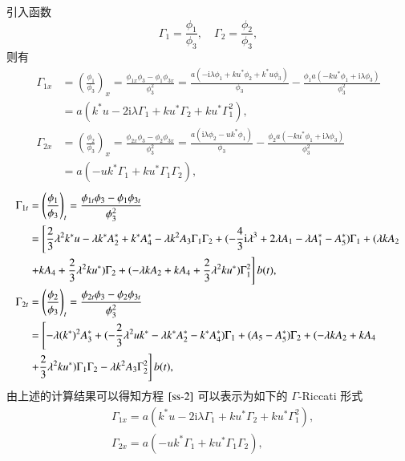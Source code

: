 引入函数
\begin{equation}
  \Gamma_{1} = \frac{\phi_{1}}{\phi_{3}}, \quad \Gamma_{2} = \frac{\phi_{2}}{\phi_{3}},
\end{equation}
则有
\begin{align}
  \Gamma_{1x} &= \left(\frac{\phi_1}{\phi_3}\right)_x=\frac{\phi_{1x}\phi_3-\phi_1\phi_{3x}}{\phi_3^2}=\frac{a(-\mathrm{i}\lambda\phi_1+ku^*\phi_2+k^*u\phi_3)}{\phi_3}-\frac{\phi_1a(-ku^*\phi_1+\mathrm{i}\lambda\phi_3)}{\phi_3^2} \nonumber\\
  &= a(k^{*}u - 2\mathrm{i}\lambda \Gamma_{1} + ku^{*}\Gamma_{2} + ku^{*}\Gamma_{1}^{2}), \\
  \Gamma_{2x} &=\left(\frac{\phi_2}{\phi_3}\right)_x=\frac{\phi_{2x}\phi_3-\phi_2\phi_{3x}}{\phi_3^2}=\frac{a(\mathrm{i}\lambda\phi_2-uk^*\phi_1)}{\phi_3}-\frac{\phi_2a(-ku^*\phi_1+\mathrm{i}\lambda\phi_3)}{\phi_3^2}\nonumber\\
  &= a(-uk^{*}\Gamma_{1} + ku^{*}\Gamma_{1}\Gamma_{2}),
\end{align}
\begin{align}
  \Gamma_{1t} &= \left(\frac{\phi_1}{\phi_3}\right)_t=\frac{\phi_{1t}\phi_3-\phi_1\phi_{3t}}{\phi_3^2} \notag \\
  &= \left[\frac{2}{3}\lambda^{2}k^{*}u - \lambda k^{*}A_{2}^{*} + k^{*}A_{4}^{*} - \lambda k^{2}A_{3}\Gamma_{1}\Gamma_{2} + (-\frac{4}{3}\mathrm{i}\lambda^{3} + 2\lambda A_{1} - \lambda A_{1}^{*} - A_{5}^{*})\Gamma_{1} + (\lambda kA_{2} \right. \notag\\
  & \left. + kA_{4} + \frac{2}{3}\lambda^{2}ku^{*})\Gamma_{2} + (-\lambda kA_{2} + kA_{4} + \frac{2}{3}\lambda^{2}ku^{*})\Gamma_{1}^{2}\right] b(t), \label{ss-gt1}\\
  \Gamma_{2t} &=\left(\frac{\phi_2}{\phi_3}\right)_t=\frac{\phi_{2t}\phi_3-\phi_2\phi_{3t}}{\phi_3^2} \notag \\
  &= \left[ -\lambda(k^{*})^{2}A_{3}^{*} + (-\frac{2}{3}\lambda^{2}uk^{*} - \lambda k^{*}A_{2}^{*} - k^{*}A_{4}^{*})\Gamma_{1} + (A_{5}-A_{5}^{*})\Gamma_{2} + (-\lambda kA_{2} +kA_{4} \right. \notag\\
  & \left. + \frac{2}{3}\lambda^{2}ku^{*})\Gamma_{1}\Gamma_{2} - \lambda k^{2}A_{3}\Gamma_{2}^{2} \right] b(t), \label{ss-gt2}
\end{align}
由上述的计算结果可以得知方程 $\ref{ss-2}$ 可以表示为如下的 $\Gamma$-Riccati 形式
\begin{align}
  & \Gamma_{1x} = a(k^{*}u - 2\mathrm{i}\lambda \Gamma_{1} + ku^{*}\Gamma_{2} + ku^{*}\Gamma_{1}^{2}), \label{ss-4} \\
  & \Gamma_{2x} = a(-uk^{*}\Gamma_{1} + ku^{*}\Gamma_{1}\Gamma_{2}), \label{ss-5}
\end{align}
